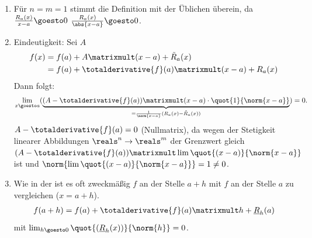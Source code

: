 \begin{bemerkungen*}
    \begin{enumerate}
        \item Für \( n=m=1 \) stimmt die Definition mit der Üblichen überein, da \( \frac{R_a(x)}{x-a}\goesto 0 \) \tiff \( \frac{R_a(x)}{\abs{x-a}}\goesto 0 \).
        \item Eindeutigkeit: Sei \( A \) \sd
        \begin{align*}
            f(x)\begin{aligned}[t]
                &=f(a)+A\matrixmult(x-a)+\tilde{R}_a(x)\\
                &=f(a)+\totalderivative{f}(a)\matrixmult (x-a)+R_a(x)
            \end{aligned}            
        \end{align*}
        Dann folgt:
        \begin{align*}
            \lim_{x \goesto a}(\underbrace{(A-\totalderivative{f}(a))\matrixmult (x-a)\cdot\quot{1}{\norm{x-a}}}_{=\frac{1}{\norm{x-a}}(R_a(x)-\tilde{R}_a(x))})=0.
        \end{align*}
        \timplies \( A-\totalderivative{f}(a)=0 \) (Nullmatrix), da wegen der Stetigkeit linearer Abbildungen \( \reals^n\to \reals^m \) der Grenzwert gleich \( (A-\totalderivative{f}(a))\matrixmult \lim \quot{(x-a)}{\norm{x-a}} \) ist und \( \norm{\lim \quot{(x-a)}{\norm{x-a}}}=1\neq 0 \).
        \item Wie in der  ist es oft zweckmäßig \( f \) an der Stelle \( a+h \) mit \( f \) an der Stelle \( a \) zu vergleichen (\( x=a+h \)).
        \begin{align*}
            f(a+h)=f(a)+\totalderivative{f}(a)\matrixmult h+\underline{R}_h(a)
        \end{align*}
        mit \( \lim_{h \goesto 0}\quot{(\underline{R}_h(x))}{\norm{h}}=0 \).
    \end{enumerate}
\end{bemerkungen*}
